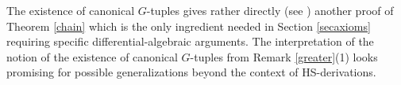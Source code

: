 \documentclass[10pt]{amsart}
\theoremstyle{definition}
\begin{document}
\noindent
The existence of canonical $G$-tuples gives rather directly (see \cite[Thm. 2.3]{K3}) another proof of Theorem \ref{chain} which is the only ingredient needed in Section \ref{secaxioms} requiring specific differential-algebraic arguments. The interpretation of the notion of the existence of canonical $G$-tuples from Remark \ref{greater}(1) looks promising for possible generalizations beyond the context of HS-derivations.


\end{document}
